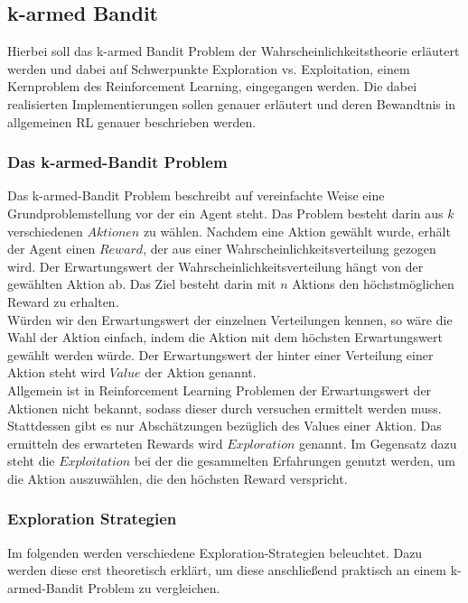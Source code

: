 \documentclass[11pt]{scrartcl}
\begin{document}
\newpage
\subsection{k-armed Bandit}
Hierbei soll das k-armed Bandit Problem der Wahrscheinlichkeitstheorie erläutert werden
und dabei auf  Schwerpunkte Exploration vs. Exploitation, einem Kernproblem des
Reinforcement Learning, eingegangen werden. Die dabei realisierten Implementierungen
sollen genauer erläutert und deren Bewandtnis in allgemeinen RL genauer beschrieben
werden.

\subsubsection{Das k-armed-Bandit Problem}
Das k-armed-Bandit Problem beschreibt auf vereinfachte Weise eine Grundproblemstellung vor
der ein Agent steht. Das Problem besteht darin aus $k$ verschiedenen $Aktionen$ zu wählen.
Nachdem eine Aktion gewählt wurde, erhält der Agent einen $Reward$, der aus einer
Wahrscheinlichkeitsverteilung gezogen wird. Der Erwartungswert der
Wahrscheinlichkeitsverteilung hängt von der gewählten Aktion ab. Das Ziel besteht darin
mit $n$ Aktions den höchstmöglichen Reward zu erhalten.\\
Würden wir den Erwartungswert der einzelnen Verteilungen kennen, so wäre die Wahl der
Aktion einfach, indem die Aktion mit dem höchsten Erwartungswert gewählt werden würde. Der
Erwartungswert der hinter einer Verteilung einer Aktion steht wird $Value$ der Aktion
genannt.\\
Allgemein ist in Reinforcement Learning Problemen der Erwartungswert der Aktionen nicht
bekannt, sodass dieser durch versuchen ermittelt werden muss. Stattdessen gibt es nur
Abschätzungen bezüglich des Values einer Aktion. Das ermitteln des erwarteten Rewards wird
$Exploration$ genannt. Im Gegensatz dazu steht die $Exploitation$ bei der die gesammelten
Erfahrungen genutzt werden, um die Aktion auszuwählen, die den höchsten Reward verspricht.

\subsubsection{Exploration Strategien}
Im folgenden werden verschiedene Exploration-Strategien beleuchtet. Dazu werden diese erst
theoretisch erklärt, um diese anschließend praktisch an einem k-armed-Bandit Problem zu
vergleichen.
\end{document}
